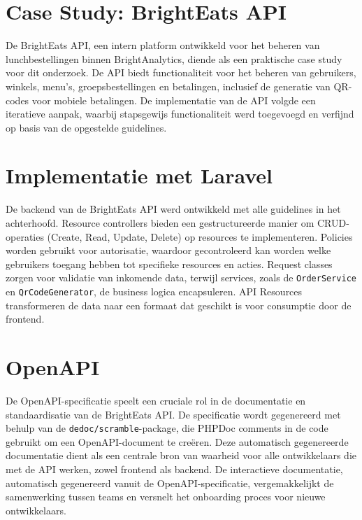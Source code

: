 \documentclass[a0,portrait]{hogent-poster}
\begin{document}
\begin{multicols}{2}
\section{Case Study: BrightEats API}

De BrightEats API, een intern platform ontwikkeld voor het beheren van lunchbestellingen binnen BrightAnalytics, diende als een praktische case study voor dit onderzoek. De API biedt functionaliteit voor het beheren van gebruikers, winkels, menu's, groepsbestellingen en betalingen, inclusief de generatie van QR-codes voor mobiele betalingen. De implementatie van de API volgde een iteratieve aanpak, waarbij stapsgewijs functionaliteit werd toegevoegd en verfijnd op basis van de opgestelde guidelines.

\section{Implementatie met Laravel}

De backend van de BrightEats API werd ontwikkeld met alle guidelines in het achterhoofd. Resource controllers bieden een gestructureerde manier om CRUD-operaties (Create, Read, Update, Delete) op resources te implementeren. Policies worden gebruikt voor autorisatie, waardoor gecontroleerd kan worden welke gebruikers toegang hebben tot specifieke resources en acties. Request classes zorgen voor validatie van inkomende data, terwijl services, zoals de \texttt{OrderService} en \texttt{QrCodeGenerator}, de business logica encapsuleren. API Resources transformeren de data naar een formaat dat geschikt is voor consumptie door de frontend.

\section{OpenAPI}

De OpenAPI-specificatie speelt een cruciale rol in de documentatie en standaardisatie van de BrightEats API. De specificatie wordt gegenereerd met behulp van de \texttt{dedoc/scramble}-package, die PHPDoc comments in de code gebruikt om een OpenAPI-document te creëren. Deze automatisch gegenereerde documentatie dient als een centrale bron van waarheid voor alle ontwikkelaars die met de API werken, zowel frontend als backend. De interactieve documentatie, automatisch gegenereerd vanuit de OpenAPI-specificatie, vergemakkelijkt de samenwerking tussen teams en versnelt het onboarding proces voor nieuwe ontwikkelaars.


\end{multicols}
\end{document}
